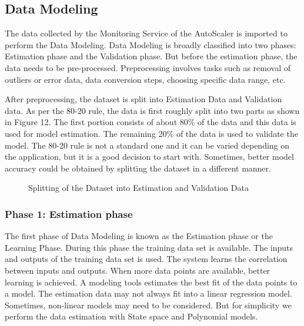 \documentclass[article,type=msc,colorback,12pt,accentcolor=tud7b]{tudthesis}
\begin{document}
 	\subsection{Data Modeling}
 	
 	The data collected by the Monitoring Service of the AutoScaler is imported to perform the Data Modeling. Data Modeling is broadly classified into two phases: Estimation phase and the Validation phase. But before the estimation phase, the data needs to be pre-processed. Preprocessing involves tasks such as removal of outliers or error data, data conversion steps, choosing specific data range, etc. 
 	
 	After preprocessing, the dataset is split into Estimation Data and Validation data. As per the 80-20 rule, the data is first roughly split into two parts as shown in Figure 12. The first portion consists of about 80\% of the data and this data is used for model estimation. The remaining 20\% of the data is used to validate the model. The 80-20 rule is not a standard one and it can be varied depending on the application, but it is a good decision to start with. Sometimes, better model accuracy could be obtained by splitting the dataset in a different manner.
 	
 	 	 \begin{figure}[!h]
 	 	 	\begin{center}
 	 	 		\makebox[\textwidth]{\texttt{[image: C5]}}
 	 	 	\end{center}
 	 	 	\caption{Splitting of the Dataset into Estimation and Validation Data}
 	 	 \end{figure}
 	
 	\subsubsection{Phase 1: Estimation phase}
 	
 	The first phase of Data Modeling is known as the Estimation phase or the Learning Phase. During this phase the training data set is available. The inputs and outputs of the training data set is used. The system learns the correlation between inputs and outputs. When more data points are available, better learning is achieved. A modeling tools estimates the best fit of the data points to a model. The estimation data may not always fit into a linear regression model. Sometimes, non-linear models may need to be considered. But for simplicity we perform the data estimation with State space and Polynomial models.
 	
\end{document}
